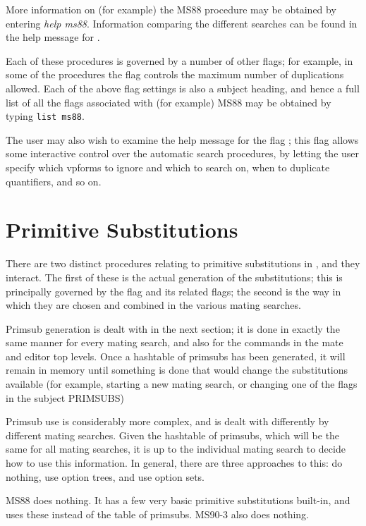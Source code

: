 More information on (for example) the MS88 procedure may be obtained by entering
{\it help ms88}.
Information comparing the different searches can be found in the help message for
.

Each of these procedures is governed by a number of other flags; for example, in
some of the procedures the flag  controls the maximum number
of duplications allowed. Each of the above flag settings is also a subject heading,
and hence a full list of all the flags associated with (for example) MS88 may be obtained
by typing {\tt list ms88}.

The user may also wish to examine the help message for the flag
; this flag allows some interactive control over the
automatic search procedures, by letting the user specify which vpforms to ignore
and which to search on, when to duplicate quantifiers, and so on.

\section{Primitive Substitutions}

There are two distinct procedures relating to primitive substitutions in {\TPS}, and they
interact. The first of these is the actual generation of the substitutions; this is
principally governed by the  flag and its related flags;
the second is the way in which they are chosen and combined in the various mating searches.

Primsub generation is dealt with in the next section; it is done in exactly the same manner
for every mating search, and also for the  commands in the mate and
editor top levels. Once a hashtable of primsubs has been generated, it will remain in memory
until something is done that would change the substitutions available (for example, starting
a new mating search, or changing one of the flags in the subject PRIMSUBS)

Primsub use is considerably more complex, and is dealt with differently by different mating searches.
Given the hashtable of primsubs, which will be the same for all mating searches, it is up to the
individual mating search to decide how to use this information. In general, there are three approaches
to this: do nothing, use option trees, and use option sets.

MS88 does nothing. It has a few very basic primitive substitutions built-in, and uses these instead of
the table of primsubs. MS90-3 also does nothing.

